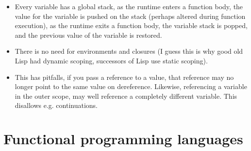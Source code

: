 \begin{itemize}

\item Every variable has a global stack, as the runtime enters a function body,
the value for the variable is pushed on the stack (perhaps altered during
function execution), as the runtime exits a function body, the variable stack
is popped, and the previous value of the variable is restored.

\item There is no need for environments and closures (I guess this is why good
old Lisp had dynamic scoping, successors of Lisp use static scoping).

\item This has pitfalls, if you pass a reference to a value, that reference may
no longer point to the same value on dereference. Likewise, referencing a
variable in the outer scope, may well reference a completely different
variable. This disallows e.g. continuations.

\end{itemize}

\section{Functional programming languages}


